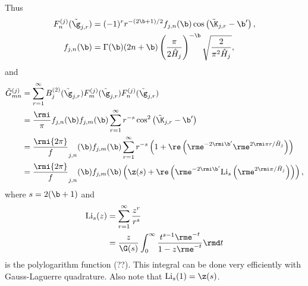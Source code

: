 \documentclass[a4paper,10pt]{article}
\begin{document}
Thus
\begin{subequations}
\begin{align}
F_n^{(j)}(\tilde \g_{j,r})&=
(-1)^{r}r^{-(2\b+1)/2}f_{j,n}(\b)\cos\left(\tilde\K_{j,r}-\b'\right),\\
f_{j,n}(\b)&=\Gamma(\b)(2n+\b)\left(\frac\pi{2\hat H_{j}}\right)^{-\b}
\sqrt{\frac2{\pi^{2}\hat H_{j} }},
\end{align}
\end{subequations}
and
\begin{align}\label{Gmn-app}
\tilde G_{mn}^{(j)}
 &=\sum_{r=1}^{\infty}B_j^{(2)}(\tilde\g_{j,r})F_m^{(j)}(\tilde\g_{j,r})F^{(j)}_n(\tilde\g_{j,r})
 \notag\\
 &=\frac\rmi\pi f_{j,n}(\b)f_{j,m}(\b)\sum_{r=1}^{\infty}r^{-s}
 \cos^{2}\left(\tilde\K_{j,r}-\b'\right)
 \notag\\
 &=\frac\rmi{2\pi} f_{j,n}(\b)f_{j,m}(\b)\sum_{r=1}^{\infty}r^{-s}
 \left (1+\re\left (\rme^{-2\rmi\b'} \rme^{2\rmi\pi r/\hat H_{j}}\right)\right)
\notag\\
 &=\frac\rmi{2\pi} f_{j,n}(\b)f_{j,m}(\b)
 \left ( \z(s)+\re\left (\rme^{-2\rmi\b'}{\rm Li}_{s} \left(\rme^{2\rmi\pi /\hat H_{j}}\right)\right)\right),
 \end{align}
where $s=2(\b+1)$ and
\begin{align}
{\rm Li}_{s}(z)&=\sum_{r=1}^{\infty}\frac{z^{r}}{r^{s}}
\notag\\
&=\frac{z}{\G(s)}\int_{0}^{\infty}\frac{t^{s-1}\rme^{-t}}{1-z\rme^{-t}}\rmd t
\end{align}
is the polylogarithm function (??). This integral can be done very efficiently with Gauss-Laguerre quadrature. Also note that ${\rm Li}_{s}(1)=\z(s)$.



\end{document}
